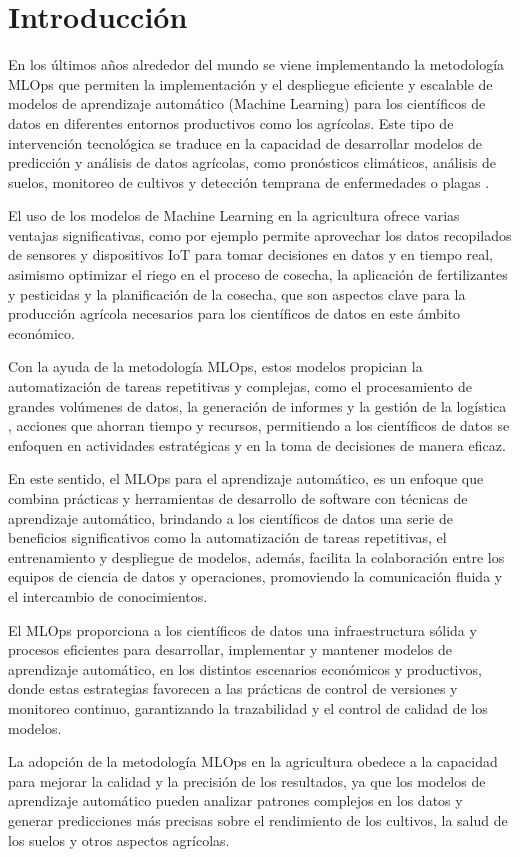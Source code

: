 \section{Introducción}

En los últimos años alrededor del mundo se viene implementando la metodología MLOps que permiten la implementación y el despliegue eficiente y escalable de modelos de aprendizaje automático (Machine Learning) para los científicos de datos en diferentes entornos productivos como los agrícolas. Este tipo de intervención tecnológica se traduce en la capacidad de desarrollar modelos de predicción y análisis de datos agrícolas, como pronósticos climáticos, análisis de suelos, monitoreo de cultivos y detección temprana de enfermedades o plagas \citep{fao2021}.

El uso de los modelos de Machine Learning en la agricultura ofrece varias ventajas significativas, como por ejemplo permite aprovechar los datos recopilados de sensores y dispositivos IoT para tomar decisiones en datos y en tiempo real, asimismo optimizar el riego en el proceso de cosecha, la aplicación de fertilizantes y pesticidas y la planificación de la cosecha, que son aspectos clave para la producción agrícola necesarios para los científicos de datos en este ámbito económico.

Con la ayuda de la metodología MLOps, estos modelos propician la automatización de tareas repetitivas y complejas, como el procesamiento de grandes volúmenes de datos, la generación de informes y la gestión de la logística \citep{arleyllano2016,monsalve2021}, acciones que ahorran tiempo y recursos, permitiendo a los científicos de datos se enfoquen en actividades estratégicas y en la toma de decisiones de manera eficaz.

En este sentido, el MLOps para el aprendizaje automático, es un enfoque que combina prácticas y herramientas de desarrollo de software con técnicas de aprendizaje automático, brindando a los científicos de datos una serie de beneficios significativos como la automatización de tareas repetitivas, el entrenamiento y despliegue de modelos, además, facilita la colaboración entre los equipos de ciencia de datos y operaciones, promoviendo la comunicación fluida y el intercambio de conocimientos.\newpage

El MLOps proporciona a los científicos de datos una infraestructura sólida y procesos eficientes para desarrollar, implementar y mantener modelos de aprendizaje automático, en los distintos escenarios económicos y productivos, donde estas estrategias favorecen a las prácticas de control de versiones y monitoreo continuo, garantizando la trazabilidad y el control de calidad de los modelos.

La adopción de la metodología MLOps en la agricultura obedece a la capacidad para mejorar la calidad y la precisión de los resultados, ya que los modelos de aprendizaje automático pueden analizar patrones complejos en los datos y generar predicciones más precisas sobre el rendimiento de los cultivos, la salud de los suelos y otros aspectos agrícolas.
